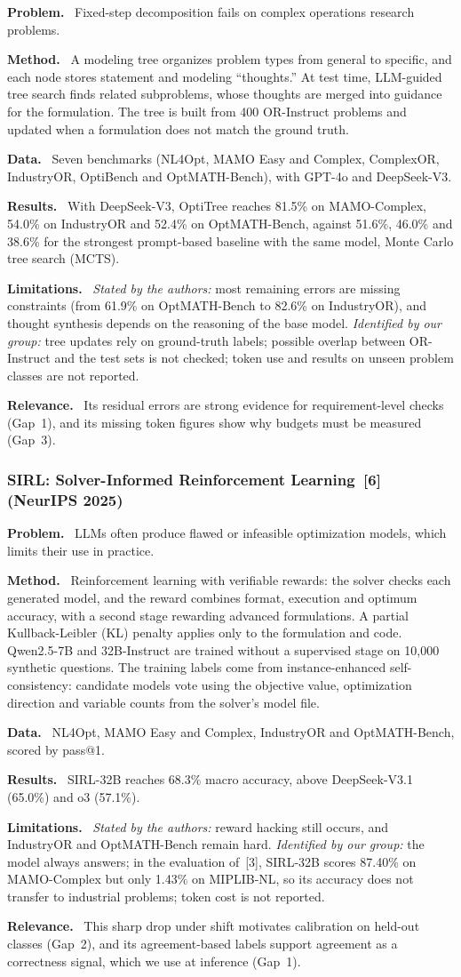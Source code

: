 \documentclass[11pt,a4paper]{article}
\newcommand{\elem}[1]{\par\noindent\textbf{#1.}~}
\begin{document}
\elem{Problem} Fixed-step decomposition fails on complex operations research problems.
\elem{Method} A modeling tree organizes problem types from general to specific, and each node stores statement and modeling ``thoughts.'' At test time, LLM-guided tree search finds related subproblems, whose thoughts are merged into guidance for the formulation. The tree is built from 400 OR-Instruct problems and updated when a formulation does not match the ground truth.
\elem{Data} Seven benchmarks (NL4Opt, MAMO Easy and Complex, ComplexOR, IndustryOR, OptiBench and OptMATH-Bench), with GPT-4o and DeepSeek-V3.
\elem{Results} With DeepSeek-V3, OptiTree reaches 81.5\% on MAMO-Complex, 54.0\% on IndustryOR and 52.4\% on OptMATH-Bench, against 51.6\%, 46.0\% and 38.6\% for the strongest prompt-based baseline with the same model, Monte Carlo tree search (MCTS).
\elem{Limitations} \textit{Stated by the authors:} most remaining errors are missing constraints (from 61.9\% on OptMATH-Bench to 82.6\% on IndustryOR), and thought synthesis depends on the reasoning of the base model. \textit{Identified by our group:} tree updates rely on ground-truth labels; possible overlap between OR-Instruct and the test sets is not checked; token use and results on unseen problem classes are not reported.
\elem{Relevance} Its residual errors are strong evidence for requirement-level checks (Gap~1), and its missing token figures show why budgets must be measured (Gap~3).

\subsubsection[SIRL (NeurIPS 2025)]{SIRL: Solver-Informed Reinforcement Learning~[6] (NeurIPS 2025)}

\elem{Problem} LLMs often produce flawed or infeasible optimization models, which limits their use in practice.
\elem{Method} Reinforcement learning with verifiable rewards: the solver checks each generated model, and the reward combines format, execution and optimum accuracy, with a second stage rewarding advanced formulations. A partial Kullback-Leibler (KL) penalty applies only to the formulation and code. Qwen2.5-7B and 32B-Instruct are trained without a supervised stage on 10,000 synthetic questions. The training labels come from instance-enhanced self-consistency: candidate models vote using the objective value, optimization direction and variable counts from the solver's model file.
\elem{Data} NL4Opt, MAMO Easy and Complex, IndustryOR and OptMATH-Bench, scored by pass@1.
\elem{Results} SIRL-32B reaches 68.3\% macro accuracy, above DeepSeek-V3.1 (65.0\%) and o3 (57.1\%).
\elem{Limitations} \textit{Stated by the authors:} reward hacking still occurs, and IndustryOR and OptMATH-Bench remain hard. \textit{Identified by our group:} the model always answers; in the evaluation of~[3], SIRL-32B scores 87.40\% on MAMO-Complex but only 1.43\% on MIPLIB-NL, so its accuracy does not transfer to industrial problems; token cost is not reported.
\elem{Relevance} This sharp drop under shift motivates calibration on held-out classes (Gap~2), and its agreement-based labels support agreement as a correctness signal, which we use at inference (Gap~1).
\end{document}
